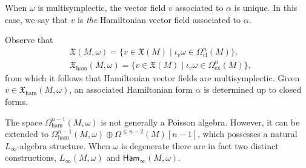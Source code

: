 \documentclass[pdftex]{sigma}
\numberwithin{equation}{section}
\newcommand{\Ham}{\mathsf{Ham}}
\newcommand{\ham}{\text{ham}}
\newcommand{\X}{\mathfrak{X}}
\begin{document}
\begin{Remark}
	When $\omega$ is multisymplectic, the vector field $v$ associated to $\alpha$ is unique. In this case, we say that $v$ is \emph{the} Hamiltonian vector field associated to $\alpha$.
\end{Remark}

Observe that
\begin{align*}
	&\mathfrak{X}(M,\omega) =
	\bigl\lbrace v \in \mathfrak{X}(M) \mid  \iota_v\omega \in \Omega_{\mathrm{cl}}^n(M) \bigr\rbrace,
	\\
	&\mathfrak{X}_{\ham}(M,\omega) =
	\bigl\lbrace v \in \mathfrak{X}(M) \mid  \iota_v\omega \in \Omega_{\mathrm{ex}}^n(M) \bigr\rbrace,
\end{align*}
from which it follows that Hamiltonian vector fields are multisymplectic. Given $v\in\X_\ham(M,\omega)$, an associated Hamiltonian form $\alpha$ is determined up to closed forms.

The space $\Omega_\ham^{n-1}(M,\omega)$ is not generally a Poisson algebra. However, it can be extended to $\Omega_\ham^{n-1}(M,\omega)\oplus\Omega^{\leq n-2}(M)[n{-}1]$, which possesses a natural $L_\infty$-algebra structure. When $\omega$ is degenerate there are in fact two distinct constructions, $L_\infty(M,\omega)$ and $\Ham_\infty(M,\omega)$.
\end{document}
